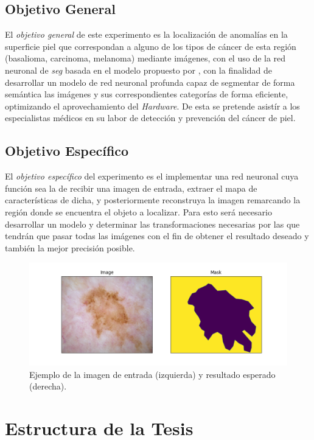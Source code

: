 \subsection{Objetivo General}
El \emph{objetivo general} de este experimento es la localización de anomalías en la superficie piel que correspondan a alguno de los tipos de cáncer de esta región (basalioma, carcinoma, melanoma) mediante imágenes, con el uso de la red neuronal de \emph{\gls{seg}} basada en el modelo propuesto por \citet{wu2019fastfcn}, con la finalidad de desarrollar un modelo de red neuronal profunda capaz de segmentar de forma semántica las imágenes y sus correspondientes categorías de forma eficiente, optimizando el aprovechamiento del \emph{Hardware}. De esta se pretende asistír a los especialistas médicos en su labor de detección y prevención del cáncer de piel.

\subsection{Objetivo Específico}
El \emph{objetivo específico} del experimento es el implementar una red neuronal cuya función sea la de recibir una imagen de entrada, extraer el mapa de características de dicha, y posteriormente reconstruya la imagen remarcando la región donde se encuentra el objeto a localizar. Para esto será necesario desarrollar un modelo y determinar las transformaciones necesarias por las que tendrán que pasar todas las imágenes con el fin de obtener el resultado deseado y también la mejor precisión posible.

\begin{figure}[h!]
    \includegraphics[width=150mm]{Figuras/plot_masks.png}
    \centering
    \caption{Ejemplo de la imagen de entrada (izquierda) y resultado esperado (derecha).}
    \label{fig:desired}
\end{figure}

\section{Estructura de la Tesis}

